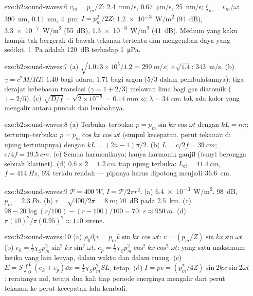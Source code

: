 \begin{solution}{exo:b2:sound-waves:6}
$v_m = p_m/Z$: \qty{2.4}{mm/s}, \qty{0.67}{\micro m/s}, \qty{25}{nm/s}; $\xi_m = v_m/\omega$:
\qty{390}{nm}, \qty{0.11}{nm}, \qty{4}{pm}; $I = p_m^2/2Z$: \qty{1.2e-3}{W/m^2} (\qty{91}{dB}),
\qty{3.3e-7}{W/m^2} (\qty{55}{dB}), \qty{1.3e-8}{W/m^2} (\qty{41}{dB}). Medium yang kaku
hampir tak bergerak di bawah tekanan tertentu dan mengemban daya yang sedikit.
\qty{1}{Pa} adalah \qty{120}{dB} terhadap \qty{1}{\micro Pa}.
\end{solution}

\begin{solution}{exo:b2:sound-waves:7}
(a) $\sqrt{1.013 \times 10^5/1.2} = \qty{290}{m/s}$; $\times\sqrt{1.4}$: \qty{343}{m/s}. (b)
$\gamma = c^2M/RT$: $1.40$ bagi udara, $1.71$ bagi argon ($5/3$ dalam pembulatannya):
tiga derajat kebebasan translasi ($\gamma = 1 + 2/3$) melawan lima bagi
gas diatomik ($1 + 2/5$). (c) $\sqrt{D/f} = \sqrt{2 \times 10^{-8}} = \qty{0.14}{mm}
\ll \lambda = \qty{34}{cm}$: tak ada kalor yang mengalir antara puncak dan lembahnya.
\end{solution}

\begin{solution}{exo:b2:sound-waves:8}
(a) Terbuka--terbuka: $p = p_m\sin kx\cos\omega t$ dengan $kL = n\pi$; tertutup--terbuka:
$p = p_m\cos kx\cos\omega t$ (simpul kecepatan, perut tekanan di ujung
tertutupnya) dengan $kL = (2n - 1)\pi/2$. (b) $L = c/2f = \qty{39}{cm}$; $c/4f = \qty{19.5}{cm}$.
(c) Semua harmoniknya; hanya harmonik ganjil (bunyi berongga sebuah klarinet).
(d) $0.6 \times 2 = \qty{1.2}{cm}$ tiap ujung terbuka: $L_{\text{ef}} = \qty{41.4}{cm}$, $f =
\qty{414}{Hz}$, $6\%$ terlalu rendah --- pipanya harus dipotong menjadi \qty{36.6}{cm}.
\end{solution}

\begin{solution}{exo:b2:sound-waves:9}
$\mathcal P = \qty{400}{W}$, $I = \mathcal P/2\pi r^2$. (a) \qty{6.4e-3}{W/m^2}, \qty{98}{dB},
$p_m = \qty{2.3}{Pa}$. (b) $r = \sqrt{400/2\pi} = \qty{8}{m}$; \qty{70}{dB} pada \qty{2.5}{km}.
(c) $98 - 20\log(r/100) - (r - 100)/100 = 70$: $r \approx \qty{950}{m}$. (d)
$\pi(10)^2/\pi(0.95)^2 \approx 110$ sirene.
\end{solution}

\begin{solution}{exo:b2:sound-waves:10}
(a) $\rho_0\partial_tv = p_mk\sin kx\cos\omega t$: $v = (p_m/Z)\sin kx\sin\omega t$. (b)
$e_k = \tfrac12\chi_Sp_m^2\sin^2kx\sin^2\omega t$, $e_p = \tfrac12\chi_Sp_m^2\cos^2kx\cos^2\omega t$:
yang satu maksimum ketika yang lain lenyap, dalam waktu dan dalam ruang. (c) $E =
S\int_0^L(e_k + e_p)\dd x = \tfrac14\chi_Sp_m^2SL$, tetap. (d) $I = pv =
(p_m^2/4Z)\sin2kx\sin2\omega t$: reratanya nol, tetapi dua kali tiap periode energinya
mengalir dari perut tekanan ke perut kecepatan lalu kembali.
\end{solution}

